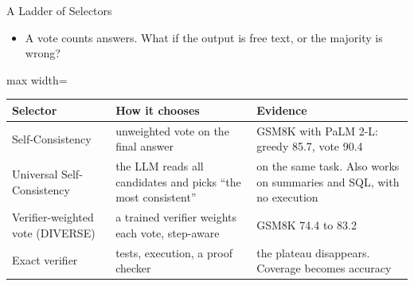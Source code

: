 \begin{frame}{A Ladder of Selectors}
    \begin{itemize}\itemsep0.3em
        \item A vote counts answers. What if the output is free text, or the majority is wrong?
    \end{itemize}
    \begin{center}
    \small
    \renewcommand{\arraystretch}{1.2}
    \begin{adjustbox}{max width=\linewidth}\begin{tabular}{>{\raggedright\arraybackslash}p{3.3cm}>{\raggedright\arraybackslash}p{4.8cm}>{\raggedright\arraybackslash}p{5.6cm}}
        \toprule
        \textbf{Selector} & \textbf{How it chooses} & \textbf{Evidence} \\
        \midrule
        Self-Consistency & unweighted vote on the final answer & GSM8K with PaLM 2-L: greedy 85.7, vote 90.4 \\
        Universal Self-Consistency & the LLM reads all candidates and picks ``the most consistent'' & 90.2 on the same task. Also works on summaries and SQL, with no execution \\
        Verifier-weighted vote (DIVERSE) & a trained verifier weights each vote, step-aware & GSM8K 74.4 to 83.2 \\
        \rowcolor{KAUSTcyan!12} Exact verifier & tests, execution, a proof checker & the plateau disappears. Coverage becomes accuracy \\
        \bottomrule
    \end{tabular}\end{adjustbox}
    \end{center}
\end{frame}

